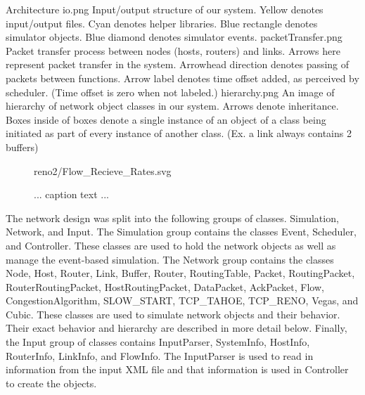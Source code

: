 \documentclass{article}
\begin{document}
Architecture
io.png
Input/output structure of our system. Yellow denotes input/output files. Cyan denotes helper libraries. Blue rectangle denotes simulator objects. Blue diamond denotes simulator events. 
packetTransfer.png
Packet transfer process between nodes (hosts, routers) and links. Arrows here represent packet transfer in the system. Arrowhead direction denotes passing of packets between functions. Arrow label denotes time offset added, as perceived by scheduler. (Time offset is zero when not labeled.)
hierarchy.png
An image of hierarchy of network object classes in our system. Arrows denote inheritance. Boxes inside of boxes denote a single instance of an object of a class being initiated as part of every instance of another class. (Ex. a link always contains 2 buffers)
\begin{figure}[htbp]
    \centering
    
    {reno2/Flow_Recieve_Rates.svg}
    \caption{ ... caption text ... }
\end{figure}
\begin{comment}
/Flow_Outstanding_Packets.svg
/Flow_Recieve_Rates.svg
/Flow_RTT.svg
/Flow_Send_Rates.svg
/Flow_Window.svg
/Host_Receive.svg
/Host_Send.svg
/Link_Flow_Rate.svg
/Link_Occupancy.svg
/Link_Packet_Loss.svg
/Vegas_Diff.svg
\end{comment}
    The network design was split into the following groups of classes. Simulation, Network, and Input. The Simulation group contains the classes Event, Scheduler, and Controller. These classes are used to hold the network objects as well as manage the event-based simulation. The Network group contains the classes Node, Host, Router, Link, Buffer, Router, RoutingTable, Packet, RoutingPacket, RouterRoutingPacket, HostRoutingPacket, DataPacket, AckPacket, Flow, CongestionAlgorithm, SLOW_START, TCP_TAHOE, TCP_RENO, Vegas, and Cubic. These classes are used to simulate network objects and their behavior. Their exact behavior and hierarchy are described in more detail below. Finally, the Input group of classes contains InputParser, SystemInfo, HostInfo, RouterInfo, LinkInfo, and FlowInfo. The InputParser is used to read in information from the input XML file and that information is used in Controller to create the objects.
\end{document}
